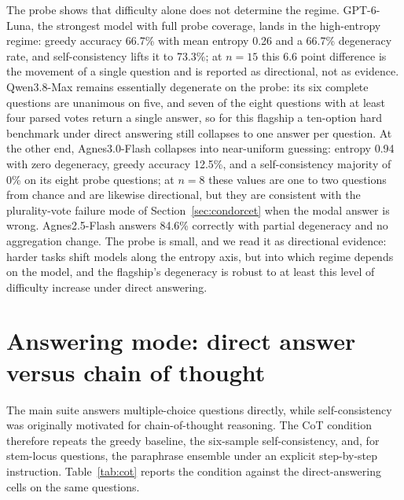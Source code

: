 \begin{table}[htbp]
\centering
\footnotesize
\caption{MMLU-Pro probe: greedy accuracy, single-sample accuracy S1, and SC-6 accuracy, with mean support-normalized sample entropy, sample degeneracy rate, and the model's main-suite entropy for comparison.}
\label{tab:mmlupro}

\end{table}

The probe shows that difficulty alone does not determine the regime. GPT-6-Luna, the strongest model with full probe coverage, lands in the high-entropy regime: greedy accuracy 66.7\% with mean entropy 0.26 and a 66.7\% degeneracy rate, and self-consistency lifts it to 73.3\%; at $n = 15$ this 6.6 point difference is the movement of a single question and is reported as directional, not as evidence. Qwen3.8-Max remains essentially degenerate on the probe: its six complete questions are unanimous on five, and seven of the eight questions with at least four parsed votes return a single answer, so for this flagship a ten-option hard benchmark under direct answering still collapses to one answer per question. At the other end, Agnes3.0-Flash collapses into near-uniform guessing: entropy 0.94 with zero degeneracy, greedy accuracy 12.5\%, and a self-consistency majority of 0\% on its eight probe questions; at $n = 8$ these values are one to two questions from chance and are likewise directional, but they are consistent with the plurality-vote failure mode of Section~\ref{sec:condorcet} when the modal answer is wrong. Agnes2.5-Flash answers 84.6\% correctly with partial degeneracy and no aggregation change. The probe is small, and we read it as directional evidence: harder tasks shift models along the entropy axis, but into which regime depends on the model, and the flagship's degeneracy is robust to at least this level of difficulty increase under direct answering.

\section{Answering mode: direct answer versus chain of thought}
\setcounter{table}{0}
\label{app:cot}
\label{sec:cot}

The main suite answers multiple-choice questions directly, while self-consistency was originally motivated for chain-of-thought reasoning. The CoT condition therefore repeats the greedy baseline, the six-sample self-consistency, and, for stem-locus questions, the paraphrase ensemble under an explicit step-by-step instruction. Table~\ref{tab:cot} reports the condition against the direct-answering cells on the same questions.

